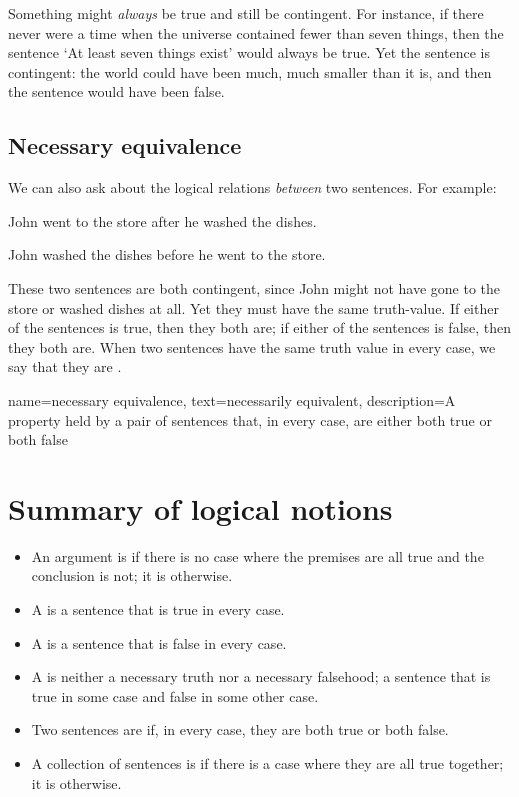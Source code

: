 Something might \emph{always} be true and still be contingent. For instance, if there never were a time when the universe contained fewer than seven things, then the sentence `At least seven things exist' would always be true. Yet the sentence is contingent: the world could have been much, much smaller than it is, and then the sentence would have been false. 

\subsection{Necessary equivalence}

We can also ask about the logical relations \emph{between} two sentences. For example:
\begin{earg}
\item[] John went to the store after he washed the dishes.
\item[] John washed the dishes before he went to the store.
\end{earg}
These two sentences are both contingent, since John might not have gone to the store or washed dishes at all. Yet they must have the same truth-value. If either of the sentences is true, then they both are; if either of the sentences is false, then they both are. When two sentences have the same truth value in every case, we say that they are .

{
name={necessary equivalence},
text={necessarily equivalent},
description={A property held by a pair of sentences that, in every case, are either both true or both false}
}


\section*{Summary of logical notions}

\begin{itemize}
\item An argument is  if there is no case where the premises are all true and the conclusion is not; it is  otherwise.

\item A  is a sentence that is true in every case.

\item A  is a sentence that is false in every case.

\item A  is neither a necessary truth nor a necessary falsehood; a sentence that is true in some case and false in some other case.

\item Two sentences are  if, in every case, they are both true or both false.

\item A collection of sentences is  if there is a case where they are all true together; it is  otherwise.
\end{itemize}



